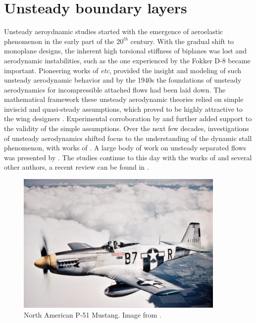\section{Unsteady boundary layers}
%
Unsteady aeroydnamic studies started with the emergence of aeroelastic phenomenon in the early part of the $20^{th}$ century. With the gradual shift to monoplane designs, the inherent high torsional stiffness of biplanes was lost and aerodynamic instabilities, such as the one experienced by the Fokker D-8 became important. Pioneering works of \cite{glauert30,karman38,theodorsen35} \textit{etc}, provided the insight and modeling of such unsteady aerodynamic behavior and by the 1940s the foundations of unsteady aerodynamics for incompressible attached flows had been laid down. The mathematical framework these unsteady aerodynamic theories relied on simple inviscid and quasi-steady assumptions, which proved to be highly attractive to the wing designers \citep{leishman00}. Experimental corroboration by \cite{halfman52} and \cite{rainey57} further added support to the validity of the simple assumptions. Over the next few decades, investigations of unsteady aerodynamics shifted focus to the understanding of the dynamic stall phenomenon, with works of \cite{mccroskey76,mccroskey81,mccroskey82experimental,mccroskey82,carr1977,crisler94}. A large body of work on unsteady separated flows was presented by \cite{ericsson86,ericsson87b,ericsson_stall88a,ericsson_stall88b}. The studies continue to this day with the works of \cite{visbal11,visbal14,visbal17,dunne2015} and several other authors, a recent review can be found in \cite{coorke15}. 
\begin{figure}[h]
	\centering
	\includegraphics[width=0.90\textwidth]{P-51-mustang}
	\vspace{10pt}
	\caption{North American P-51 Mustang. Image from \cite{wikipedia_mustang}.}
	\label{fig:mustang}
\end{figure}

